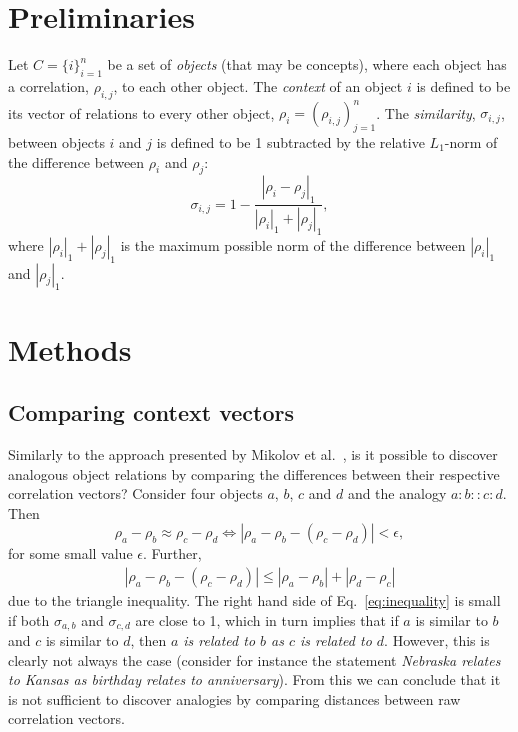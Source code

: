 \documentclass{article} %
\newcommand{\rn}[1]{\rho_{#1}}
\newcommand{\rns}[1]{|\rn{#1}|_1}
\newcommand{\sy}[1]{\sigma_{#1}}
\newcommand{\dnm}[2]{|\rn{#1}-\rn{#2}|_1}
\begin{document}
\section{Preliminaries}
\label{sec:preliminaries}

Let $C = \{i\}_{i=1}^n$ be a set of \emph{objects} (that may be concepts), where each object has a
correlation, $\rn{i,j}$, to each other object. The \emph{context} of an object $i$ is defined to be its
vector of relations to every other object, $\rn{i} = (\rn{i,j})_{j=1}^n$. The \emph{similarity}, $\sy{i,j}$, between
objects $i$ and $j$ is defined to be 1 subtracted by the relative $L_1$-norm of the difference between $\rn{i}$ and $\rn{j}$:
\begin{equation}\label{eq:sim}
\sy{i,j} = 1 - \frac{\dnm{i}{j}}{\rns{i} + \rns{j}},
\end{equation}
where $\rns{i} + \rns{j}$ is the maximum possible norm of the difference between $\rns{i}$ and $\rns{j}$.

\section{Methods}

\subsection{Comparing context vectors}
Similarly to the approach presented by Mikolov et al.\ \cite{Mikolov2013}, is it possible to discover analogous
object relations by comparing the differences between their respective correlation vectors?
Consider four objects $a$, $b$, $c$ and $d$ and the analogy $a : b :: c : d$. Then
\begin{equation}\label{}
\rn{a} - \rn{b} \approx \rn{c} - \rn{d} \Leftrightarrow |\rn{a} - \rn{b} - (\rn{c} - \rn{d})| < \epsilon,
\end{equation}
for some small value $\epsilon$. Further,
\begin{eqnarray}\label{eq:inequality}
|\rn{a} - \rn{b} - (\rn{c} - \rn{d})| \leq |\rn{a} - \rn{b}| + |\rn{d} - \rn{c}|
\end{eqnarray}
due to the triangle inequality. The right hand side of Eq.\ \ref{eq:inequality} is small if both $\sy{a,b}$ and $\sy{c,d}$
are close to 1, which in turn implies that if $a$ is similar to $b$ and $c$ is similar to $d$, then \emph{$a$ is related to $b$
	as $c$ is related to $d$}. However, this is clearly not always the case (consider for instance the statement \emph{Nebraska relates to
	Kansas as birthday relates to anniversary}). From this we can conclude that it is not sufficient to discover
analogies by comparing distances between raw correlation vectors.
\end{document}
